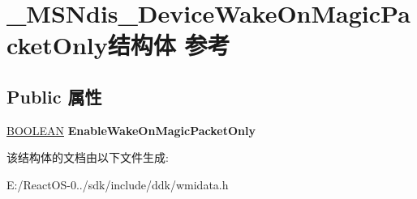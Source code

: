 \hypertarget{struct___m_s_ndis___device_wake_on_magic_packet_only}{}\section{\+\_\+\+M\+S\+Ndis\+\_\+\+Device\+Wake\+On\+Magic\+Packet\+Only结构体 参考}
\label{struct___m_s_ndis___device_wake_on_magic_packet_only}
\subsection*{Public 属性}
\begin{DoxyCompactItemize}
\item 
\mbox{\label{struct___m_s_ndis___device_wake_on_magic_packet_only_aa084dc7584d7e00f09b7ef9acb77425e}} 
\hyperlink{_processor_bind_8h_a112e3146cb38b6ee95e64d85842e380a}{B\+O\+O\+L\+E\+AN} {\bfseries Enable\+Wake\+On\+Magic\+Packet\+Only}
\end{DoxyCompactItemize}


该结构体的文档由以下文件生成\+:\begin{DoxyCompactItemize}
\item 
E\+:/\+React\+O\+S-\/0../sdk/include/ddk/wmidata.\+h\end{DoxyCompactItemize}
